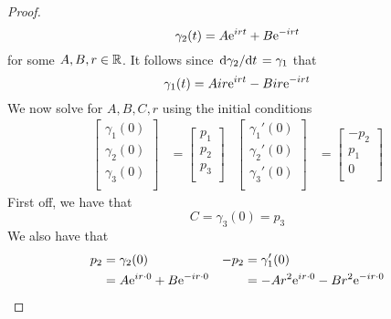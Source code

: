 \documentclass[../psets.tex]{subfiles}
\begin{document}
\begin{enumerate}[label={\textbf{4.3.\roman*.}}]
\begin{enumerate}
\begin{proof}
            \begin{equation*}
                \gamma_2(t) = A\e[irt]+B\e[-irt]
            \end{equation*}
            for some $A,B,r\in\R$. It follows since $\dv*{\gamma_2}{t}=\gamma_1$ that
            \begin{equation*}
                \gamma_1(t) = Air\e[irt]-Bir\e[-irt]
            \end{equation*}
            We now solve for $A,B,C,r$ using the initial conditions
            \begin{align*}
                \begin{bmatrix}
                    \gamma_1(0)\\
                    \gamma_2(0)\\
                    \gamma_3(0)\\
                \end{bmatrix}
                &=
                \begin{bmatrix}
                    p_1\\
                    p_2\\
                    p_3\\
                \end{bmatrix}&
                \begin{bmatrix}
                    \gamma_1'(0)\\
                    \gamma_2'(0)\\
                    \gamma_3'(0)\\
                \end{bmatrix}
                &=
                \begin{bmatrix}
                    -p_2\\
                    p_1\\
                    0\\
                \end{bmatrix}
            \end{align*}
            First off, we have that
            \begin{equation*}
                C = \gamma_3(0) = p_3
            \end{equation*}
            We also have that
            \begin{align*}
                p_2 &= \gamma_2(0)&
                    -p_2 &= \gamma_1'(0)\\
                &= A\e[ir\cdot 0]+B\e[-ir\cdot 0]&
                    &= -Ar^2\e[ir\cdot 0]-Br^2\e[-ir\cdot 0]\\

\end{align*}
\end{proof}
\end{enumerate}
\end{enumerate}
\end{document}
